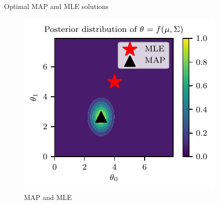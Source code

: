 \documentclass{beamer}
\begin{document}
\begin{frame}{Optimal MAP and MLE solutions}
\begin{figure}
	\centering
	\includegraphics{../../notebooks/bayesian-linear-map-mle}
	\caption{MAP and MLE}
	\label{fig:bayesian-linear-dataset}
\end{figure}

\end{frame}
\end{document}
